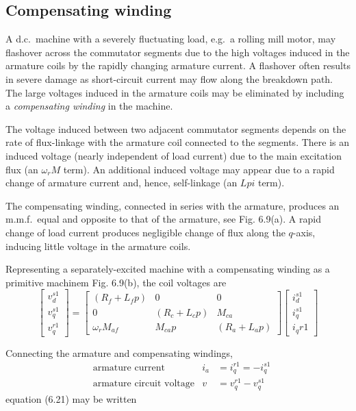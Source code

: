 \documentclass[a4paper,numbers=noenddot,12pt]{scrbook}
\begin{document}
\subsection{Compensating winding} A d.c.\ machine with a severely fluctuating load, e.g.\ a rolling mill motor, may flashover across the commutator segments due to the high voltages induced in the armature coils by the rapidly changing armature current. A flashover often results in severe damage as short-circuit current may flow along the breakdown path. The large voltages induced in the armature coils may be eliminated by including a \textit{compensating winding} in the machine.

The voltage induced between two adjacent commutator segments depends on the rate of flux-linkage with the armature coil connected to the segments. There is an induced voltage (nearly independent of load current) due to the main excitation flux (an $\omega_r M$ term). An additional induced voltage may appear due to a rapid change of armature current and, hence, self-linkage (an $L p i$ term).

The compensating winding, connected in series with the armature, produces an m.m.f.\ equal and opposite to that of the armature, see Fig. 6.9(a). A rapid change of load current produces negligible change of flux along the $q$-axis, inducing little voltage in the armature coils.

Representing a separately-excited machine with a compensating winding as a primitive machinem Fig. 6.9(b), the coil voltages are
\begin{equation}
    \begin{bmatrix}
        v_d^{s1} \\[2ex] v_q^{s1} \\[2ex] v_q^{r1}
    \end{bmatrix} = 
    \begin{bmatrix}
        (R_f + L_f p) & 0 & 0 \\[2ex]
        0 & (R_c + L_c p) & M_{ca} \\[2ex]
        \omega_r M_{af} & M_{ca} p & (R_a + L_a p)
    \end{bmatrix}
    \begin{bmatrix}
        i_d^{s1} \\[2ex] i_q^{s1} \\[2ex] i_q{r1}
    \end{bmatrix}
    \label{}
\end{equation}

Connecting the armature and compensating windings,
\begin{align*}
    &\text{armature current}  & i_a & = i_q^{r1} = -i_q^{s1} \\
    &\text{armature circuit voltage} & v & = v_q^{r1} - v_q^{s1}
    \label{}
\end{align*}
equation (6.21) may be written
\end{document}
